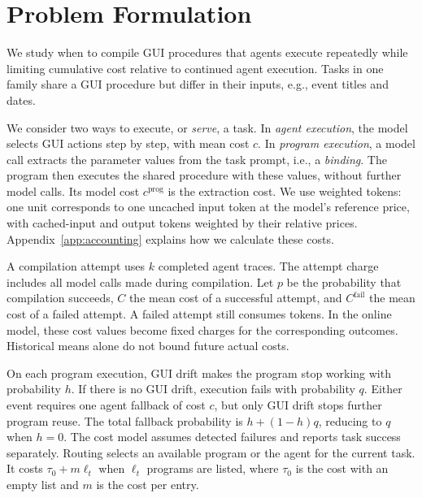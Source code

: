 \section{Problem Formulation}
\label{sec:formulation}

We study when to compile GUI procedures that agents execute repeatedly while limiting cumulative cost relative to continued agent execution.
Tasks in one family share a GUI procedure but differ in their inputs, e.g., event titles and dates.

We consider two ways to execute, or \emph{serve}, a task.
In \emph{agent execution}, the model selects GUI actions step by step, with mean cost $c$.
In \emph{program execution}, a model call extracts the parameter values from the task prompt, i.e., a \emph{binding}.
The program then executes the shared procedure with these values, without further model calls.
Its model cost $c^{\mathrm{prog}}$ is the extraction cost.
We use weighted tokens: one unit corresponds to one uncached input token at the model's reference price, with cached-input and output tokens weighted by their relative prices.
Appendix~\ref{app:accounting} explains how we calculate these costs.

A compilation attempt uses $k$ completed agent traces.
The attempt charge includes all model calls made during compilation.
Let $p$ be the probability that compilation succeeds, $C$ the mean cost of a successful attempt, and $C^{\mathrm{fail}}$ the mean cost of a failed attempt.
A failed attempt still consumes tokens.
In the online model, these cost values become fixed charges for the corresponding outcomes.
Historical means alone do not bound future actual costs.

On each program execution, GUI drift makes the program stop working with probability $h$.
If there is no GUI drift, execution fails with probability $q$.
Either event requires one agent fallback of cost $c$, but only GUI drift stops further program reuse.
The total fallback probability is $h+(1-h)q$, reducing to $q$ when $h=0$.
The cost model assumes detected failures and reports task success separately.
Routing selects an available program or the agent for the current task.
It costs $\tau_0+m\ell_t$ when $\ell_t$ programs are listed, where $\tau_0$ is the cost with an empty list and $m$ is the cost per entry.

